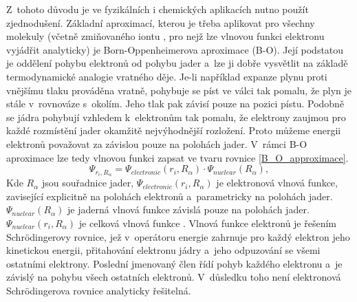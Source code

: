 \documentclass[
digital, %
table,   %
nolof,     %
nolot,     %
oneside,
]{fithesis3}
\begin{document}
Z~tohoto důvodu je ve fyzikálních i chemických aplikacích nutno použít zjednodušení. Základní aproximací, kterou je třeba aplikovat pro všechny molekuly (včetně zmiňovaného iontu , pro nejž lze vlnovou funkci elektronu vyjádřit analyticky) je Born-Oppenhei\-me\-ro\-va aproximace (B-O).
Její podstatou je oddělení pohybu elektronů od pohybu jader a~lze ji dobře vysvětlit na základě termodynamické analogie vratného děje. Je-li například expanze plynu proti vnějšímu tlaku prováděna vratně, pohybuje se píst ve válci tak pomalu, že plyn je stále v~rovnováze s~okolím. Jeho tlak pak závisí pouze na pozici pístu. Podobně se jádra pohybují vzhledem k~elektronům tak pomalu, že elektrony zaujmou pro každé rozmístění jader okamžitě nejvýhodnější rozložení. Proto můžeme energii elektronů považovat za závislou pouze na polohách jader. V~rámci B-O aproximace lze tedy vlnovou funkci zapsat ve tvaru rovnice \ref{B_O_approximace}.
\begin{equation}
\Psi_{r_i,R_{\alpha}} = \Psi_{electronic}(r_i,R_{\alpha}) \cdot \Psi_{nuclear}(R_{\alpha}),
\label{B_O_approximace}
\end{equation}
Kde $R_{\alpha}$ jsou souřadnice jader, $\Psi_{electronic}(r_i,R_{\alpha})$ je elektronová vlnová funkce, zavisející explicitně na polohách elektronů a~parametricky na polohách jader. $\Psi_{nuclear}(R_{\alpha})$ je jaderná vlnová funkce závislá pouze na polohách jader. $ \Psi_{nuclear}(r_i, R_{\alpha}) $ je celková vlnová funkce \cite{lechamolecularmodeling}.
Vlnová funkce elektronů je řešením Schrödingerovy rovnice, jež v~operátoru energie zahrnuje pro každý elektron jeho kinetickou energii, přitahování elektronu jádry a~jeho odpuzování se všemi ostatními elektrony. Poslední jmenovaný člen řídí pohyb každého elektronu a~je závislý na pohybu všech ostatních elektronů. V~důsledku toho není elektronová Schrödingerova rovnice analyticky řešitelná.\\
\end{document}
